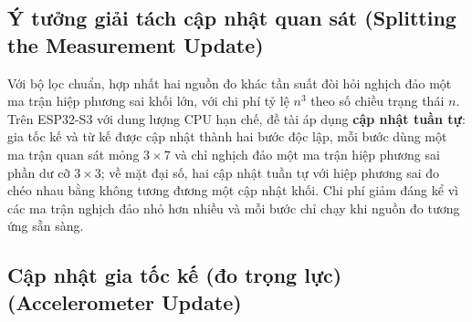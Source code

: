 \subsection{Ý tưởng giải tách cập nhật quan sát (Splitting the Measurement Update)}

Với bộ lọc chuẩn, hợp nhất hai nguồn đo khác tần suất đòi hỏi nghịch đảo một ma trận hiệp phương sai khối lớn, với chi phí tỷ lệ $n^3$ theo số chiều trạng thái $n$. Trên ESP32-S3 với dung lượng CPU hạn chế, đề tài áp dụng \textbf{cập nhật tuần tự}: gia tốc kế và từ kế được cập nhật thành hai bước độc lập, mỗi bước dùng một ma trận quan sát mỏng $3\times 7$ và chỉ nghịch đảo một ma trận hiệp phương sai phần dư cỡ $3\times 3$; về mặt đại số, hai cập nhật tuần tự với hiệp phương sai đo chéo nhau bằng không tương đương một cập nhật khối. Chi phí giảm đáng kể vì các ma trận nghịch đảo nhỏ hơn nhiều và mỗi bước chỉ chạy khi nguồn đo tương ứng sẵn sàng.

\subsection{Cập nhật gia tốc kế (đo trọng lực) (Accelerometer Update)}

